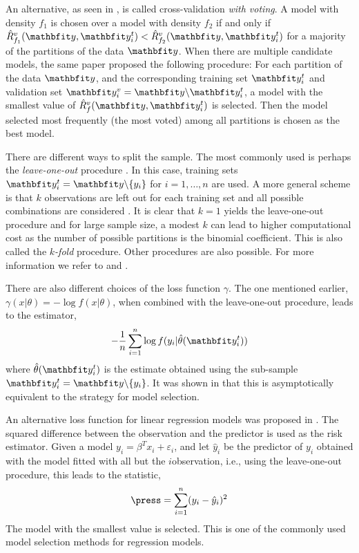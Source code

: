 An alternative, as seen in \cite{Yang:2007vx}, is called cross-validation \emph{with voting}. A model with density $f_1$ is chosen over a model with density $f_2$ if and only if $\hat{R}_{f_1}^v(\data,\data_i^t) < \hat{R}_{f_2}^v(\data,\data_i^t)$ for a majority of the partitions of the data $\data$. When there are multiple candidate models, the same paper proposed the following procedure: For each partition of the data $\data$, and the corresponding training set $\data_i^t$ and validation set $\data_i^v = \data\backslash\data_i^t$, a model with the smallest value of $\hat{R}_f^v(\data,\data_i^t)$ is selected. Then the model selected most frequently (the most voted) among all partitions is chosen as the best model.

There are different ways to split the sample. The most commonly used is perhaps the \emph{leave-one-out} procedure \cite{Stone:1974vx,Geisser:1975vx}. In this case, training sets $\data_i^t = \data\backslash\{y_i\}$ for $i = 1,\dots,n$ are used. A more general scheme is that $k$ observations are left out for each training set and all possible combinations are considered \cite{Shao:1993vx}. It is clear that $k=1$ yields the leave-one-out procedure and for large sample size, a modest $k$ can lead to higher computational cost as the number of possible partitions is the binomial coefficient. This is also called the $k$\emph{-fold} procedure. Other procedures are also possible. For more information we refer to \cite{Stone:1978vx} and \cite{Hjorth:1994vx}.

There are also different choices of the loss function $\gamma$. The one mentioned earlier, $\gamma(x|\theta) = -\log f(x|\theta)$, when combined with the leave-one-out procedure, leads to the estimator,
\begin{equation}
  -\frac{1}{n}\sum_{i=1}^n\log f(y_i|\hat\theta(\data_i^t))
\end{equation}
where $\hat\theta(\data_i^t)$ is the estimate obtained using the sub-sample $\data_i^t = \data\backslash\{y_i\}$. It was shown in \cite{Stone:1978vx} that this is asymptotically equivalent to the \aic strategy for model selection.

An alternative loss function for linear regression models was proposed in \cite{Allen:1974vx}. The squared difference between the observation and the predictor is used as the risk estimator. Given a model $y_i = \beta^T x_i + \varepsilon_i$, and let $\hat{y}_i$ be the predictor of $y_i$ obtained with the model fitted with all but the $i$\xth observation, i.e., using the leave-one-out procedure, this leads to the \press statistic,
\begin{equation}
  \press = \sum_{i=1}^n(y_i - \hat{y}_i)^2
\end{equation}
The model with the smallest \press value is selected. This is one of the commonly used model selection methods for regression models.

